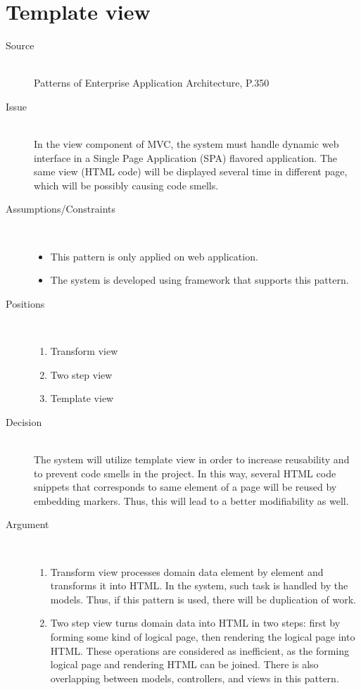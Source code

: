 \section{Template view}
\begin{description}
\item [Source]~\\
Patterns of Enterprise Application Architecture, P.350 \cite{Fowler:2002:PEA:579257}

\item [Issue]~\\
In the view component of MVC, the system must handle dynamic web interface in a Single Page Application (SPA) flavored application. The same view (HTML code) will be displayed several time in different page, which will be possibly causing code smells.

\item [Assumptions/Constraints]~
\begin{itemize}
\item This pattern is only applied on web application.
\item The system is developed using framework that supports this pattern.
\end{itemize}


\item [Positions]~
\begin{enumerate}
\item Transform view
\item Two step view
\item Template view
\end{enumerate}


\item [Decision] ~\\
The system will utilize template view in order to increase reusability and to prevent code smells in the project. In this way, several HTML code snippets that corresponds to same element of a page will be reused by embedding markers. Thus, this will lead to a better modifiability as well.

\item [Argument]~
\begin{enumerate}
\item Transform view processes domain data element by element and transforms it into HTML. In the system, such task is handled by the models. Thus, if this pattern is used, there will be duplication of work.

\item Two step view turns domain data into HTML in two steps: first by forming some kind of logical page, then rendering the logical page into HTML. These operations are considered as inefficient, as the forming logical page and rendering HTML can be joined. There is also overlapping between models, controllers, and views in this pattern.


\end{enumerate}
\end{description}
